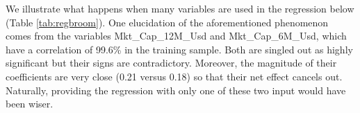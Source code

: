 \documentclass[]{krantz}
\makeatletter
\newenvironment{Shaded}{\begin{snugshade}}{\end{snugshade}}
\newcommand{\CommentTok}[1]{\textcolor[rgb]{0.37,0.37,0.37}{\textit{#1}}}
\newcommand{\DataTypeTok}[1]{\textcolor[rgb]{0.27,0.27,0.27}{#1}}
\newcommand{\DecValTok}[1]{\textcolor[rgb]{0.06,0.06,0.06}{#1}}
\newcommand{\KeywordTok}[1]{\textcolor[rgb]{0.27,0.27,0.27}{\textbf{#1}}}
\newcommand{\NormalTok}[1]{#1}
\newcommand{\OperatorTok}[1]{\textcolor[rgb]{0.43,0.43,0.43}{\textbf{#1}}}
\newcommand{\OtherTok}[1]{\textcolor[rgb]{0.37,0.37,0.37}{#1}}
\newcommand{\StringTok}[1]{\textcolor[rgb]{0.5,0.5,0.5}{#1}}
\newenvironment{kframe}{%
\medskip{}
\setlength{\fboxsep}{.8em}
 \def\at@end@of@kframe{}%
 \ifinner\ifhmode%
  \def\at@end@of@kframe{\end{minipage}}%
  \begin{minipage}{\columnwidth}%
 \fi\fi%
 \def\FrameCommand##1{\hskip\@totalleftmargin \hskip-\fboxsep
 \colorbox{shadecolor}{##1}\hskip-\fboxsep
     \hskip-\linewidth \hskip-\@totalleftmargin \hskip\columnwidth}%
 \MakeFramed {\advance\hsize-\width
   \@totalleftmargin\z@ \linewidth\hsize
   \@setminipage}}%
 {\par\unskip\endMakeFramed%
 \at@end@of@kframe}
\renewenvironment{Shaded}{\begin{kframe}}{\end{kframe}}
\theoremstyle{definition}
\theoremstyle{definition}
\theoremstyle{definition}
\theoremstyle{remark}
\makeatother
\begin{document}
We illustrate what happens when many variables are used in the
regression below (Table \ref{tab:regbroom}). One elucidation of the
aforementioned phenomenon comes from the variables Mkt\_Cap\_12M\_Usd
and Mkt\_Cap\_6M\_Usd, which have a correlation of 99.6\% in the
training sample. Both are singled out as highly significant but their
signs are contradictory. Moreover, the magnitude of their coefficients
are very close (0.21 versus 0.18) so that their net effect cancels out.
Naturally, providing the regression with only one of these two input
would have been wiser.

\footnotesize

\begin{Shaded}
\end{Shaded}
\end{document}
